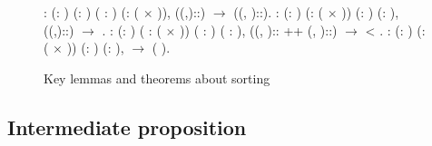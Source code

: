 \begin{figure}
  \begin{coqdoccode}
  \coqdocnoindent
    : \coqdockw{\ensuremath{\forall}} (: ) (: ) ( : ) (:  ( \ensuremath{\times} )),\coqdoceol
  \coqdocindent{1.00em}
   ((,)::) \ensuremath{\rightarrow} ((, )::).\coqdoceol
  \coqdocemptyline
  \coqdocnoindent
    : \coqdockw{\ensuremath{\forall}} (: ) (:  ( \ensuremath{\times} )) (: ) (: ),\coqdoceol
  \coqdocindent{1.00em}
   ((,)::) \ensuremath{\rightarrow}  .\coqdoceol
  \coqdocemptyline
  \coqdocnoindent
    : \coqdockw{\ensuremath{\forall}} (: ) ( :  ( \ensuremath{\times} )) ( : ) ( : ),\coqdoceol
  \coqdocindent{1.00em}
  ((, ):: ++ (, )::) \ensuremath{\rightarrow}  < .\coqdoceol
  \coqdocemptyline
  \coqdocnoindent
    : \coqdockw{\ensuremath{\forall}} (: ) (:  ( \ensuremath{\times} )) (: ) (: ),\coqdoceol
  \coqdocindent{1.00em}
    \ensuremath{\rightarrow}  (   ).\coqdoceol
  \coqdocemptyline
  \end{coqdoccode}
  \caption{Key lemmas and theorems about sorting}
  \label{fig:key_sorting_lemmas}
\end{figure}

\subsection{Intermediate proposition}
\label{intermediate_prop}

